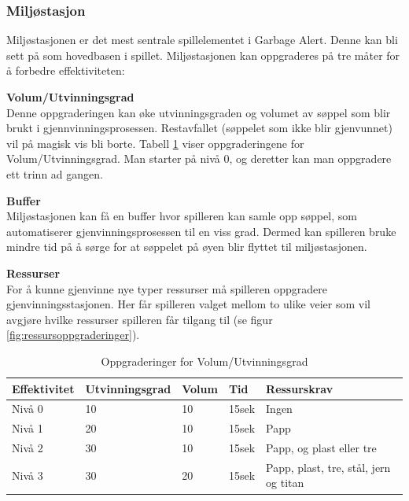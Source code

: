 \subsubsection{Miljøstasjon} \label{miljostasjon}
Miljøstasjonen er det mest sentrale spillelementet i Garbage
Alert. Denne kan bli sett på som hovedbasen i spillet.
Miljøstasjonen kan oppgraderes på tre måter for å forbedre effektiviteten:\\
\begin{description}
	\item \textbf{Volum/Utvinningsgrad}\\Denne oppgraderingen kan øke utvinningsgraden og volumet av søppel som blir brukt i gjennvinningsprosessen. Restavfallet (søppelet som ikke blir gjenvunnet) vil på magisk vis bli borte. Tabell \ref{tab:effektivitet} viser oppgraderingene for Volum/Utvinningsgrad. Man starter på nivå 0, og deretter kan man oppgradere ett trinn ad gangen.
	\item \textbf{Buffer}\\Miljøstasjonen kan få en buffer hvor spilleren kan samle opp søppel, som automatiserer gjenvinningsprosessen til en viss grad. Dermed kan spilleren bruke mindre tid på å sørge for at søppelet på øyen blir flyttet til miljøstasjonen.
	\item \textbf{Ressurser}\\For å kunne gjenvinne nye typer ressurser må
		spilleren oppgradere gjenvinningsstasjonen. Her får spilleren valget
		mellom to ulike veier som vil avgjøre hvilke ressurser spilleren får
		tilgang til (se figur \ref{fig:ressursoppgraderinger}).
\end{description}

\begin{table} \label{tab:effektivitet}
\begin{tabular}[\textwidth]{ l  l  p{3cm}  l  p{4cm} } %
\hline
\bf{Effektivitet} & \bf{Utvinningsgrad} & \bf{Volum} & \bf{Tid} & \bf{Ressurskrav} \\
\hline
Nivå 0 & 10 & 10 & 15sek & Ingen  \\
Nivå 1 & 20 & 10 & 15sek & Papp \\
Nivå 2 & 30 & 10 & 15sek & Papp, og plast eller tre \\
Nivå 3 & 30 & 20 & 15sek & Papp, plast, tre, stål, jern og titan \\
\hline
\end{tabular}
\caption{Oppgraderinger for Volum/Utvinningsgrad}
\end{table}



